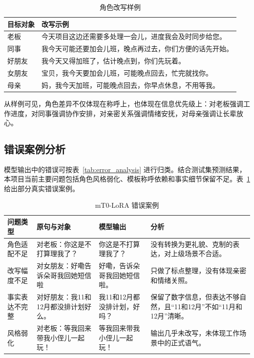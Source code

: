 \documentclass[12pt,a4paper]{ctexart}
\begin{document}
\begin{table}[H]
\centering
\caption{角色改写样例}
\begin{tabular}{p{2.2cm}|p{10cm}}
\toprule
目标对象 & 改写示例 \\
\midrule
老板 & 今天项目这边还需要多处理一会儿，进度我会及时同步给您。 \\
同事 & 我今天可能还要加会儿班，晚点再过去，你们方便的话先开始。 \\
好朋友 & 我今天又得加班了，估计晚点到，你们先玩着。 \\
女朋友 & 宝贝，我今天要加会儿班，可能晚点回去，忙完就找你。 \\
母亲 & 妈，我今天加班，可能晚点回去，你早点休息，不用等我。 \\
\bottomrule
\end{tabular}
\end{table}

从样例可见，角色差异不仅体现在称呼上，也体现在信息优先级上：对老板强调工作进度，对同事强调协作安排，对亲密关系强调情绪安抚，对母亲强调让长辈放心。

\subsection{错误案例分析}

模型输出中的错误可按表~\ref{tab:error_analysis} 进行归类。结合测试集预测结果，本项目当前主要问题包括角色风格弱化、模板称呼依赖和事实细节保留不足。表~\ref{tab:lora_error_examples} 给出部分真实错误案例。

\begin{table}[H]
\centering
\caption{mT0-LoRA 错误案例}
\label{tab:lora_error_examples}
\begin{tabular}{p{2.2cm}|p{3.4cm}|p{4.2cm}|p{3.2cm}}
\toprule
问题类型 & 原句与对象 & 模型输出 & 分析 \\
\midrule
角色适配不足 & 对老板：你这是不打算理我了？ & 你这是不打算理我了？ & 没有转换为更礼貌、克制的表达，对上级场景不合适。 \\
改写幅度不足 & 对女朋友：好嘞告诉朵哥我回她短信啦 & 好嘞，告诉朵哥我回她短信啦。 & 只做了标点整理，没有体现亲密和情绪关照。 \\
事实表达不完整 & 对好朋友：我11和12月都没排计划好么。 & 我11和12月都没排计划，好吗？ & 保留了数字信息，但表达不够自然，且“11和12月”不如“11月和12月”清晰。 \\
风格弱化 & 对老板：等我回来带我小侄儿一起玩！ & 等我回来带我小侄儿一起玩！ & 输出几乎未改写，未体现工作场景中的正式语气。 \\
\bottomrule
\end{tabular}
\end{table}
\end{document}
